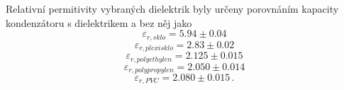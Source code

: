 \documentclass{../concepts/prepareprotokol} %
\begin{document}
Relativní permitivity vybraných dielektrik byly určeny porovnáním kapacity kondenzátoru s dielektrikem a bez něj jako
\begin{equation*}
  \varepsilon_{r, sklo} = 5.94 \pm 0.04
\end{equation*}
\begin{equation*}
  \varepsilon_{r, plexisklo} = 2.83 \pm 0.02
\end{equation*}
\begin{equation*}
  \varepsilon_{r, polyethylen} = 2.125 \pm 0.015
\end{equation*}
\begin{equation*}
  \varepsilon_{r, polypropylen} = 2.050 \pm 0.014
\end{equation*}
\begin{equation*}
  \varepsilon_{r, PVC} = 2.080 \pm 0.015 \,.
\end{equation*}

\end{document}
